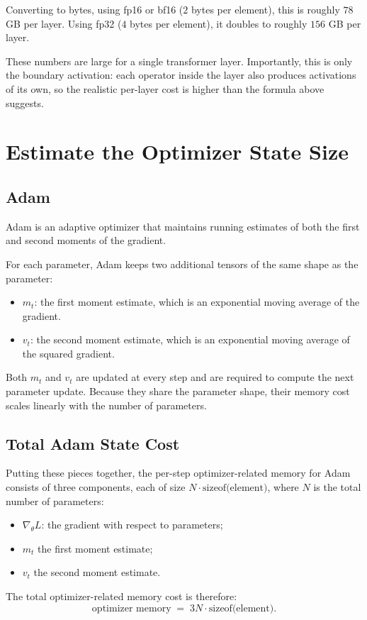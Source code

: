 Converting to bytes, using fp16 or bf16 ($2$ bytes per element), this is roughly $78$ GB per layer. Using fp32 ($4$ bytes per element), it doubles to roughly $156$ GB per layer.

These numbers are large for a single transformer layer. Importantly, this is only the boundary activation: each operator inside the layer also produces activations of its own, so the realistic per-layer cost is higher than the formula above suggests.

\section{Estimate the Optimizer State Size}
\subsection{Adam}
Adam is an adaptive optimizer that maintains running estimates of both the first and second moments of the gradient.

For each parameter, Adam keeps two additional tensors of the same shape as the parameter:
\begin{itemize}
    \item $m_t$: the first moment estimate, which is an exponential moving average of the gradient.
    \item $v_t$: the second moment estimate, which is an exponential moving average of the squared gradient.
\end{itemize}

Both $m_t$ and $v_t$ are updated at every step and are required to compute the next parameter update. Because they share the parameter shape, their memory cost scales linearly with the number of parameters.

\subsection{Total Adam State Cost}

Putting these pieces together, the per-step optimizer-related memory for Adam consists of three components, each of size $N \cdot \text{sizeof(element)}$, where $N$ is the total number of parameters:
\begin{itemize}
    \item $\nabla_{\theta} L$: the gradient with respect to parameters;
    \item $m_t$ the first moment estimate;
    \item $v_t$ the second moment estimate.
\end{itemize}

The total optimizer-related memory cost is therefore:
\[
    \text{optimizer memory}
    \;=\; 3 N \cdot \text{sizeof(element)}.
\]
